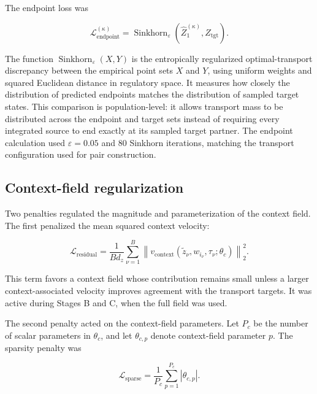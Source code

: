 The endpoint loss was

\begin{equation}
\mathcal{L}_{\mathrm{endpoint}}^{(\kappa)}
=
\operatorname{Sinkhorn}_{\varepsilon}
\left(
\widehat{Z}_1^{(\kappa)},
Z_{\mathrm{tgt}}
\right).
\label{appb-eq:methods-endpoint-loss}
\end{equation}

The function
\(\operatorname{Sinkhorn}_{\varepsilon}(X,Y)\) is the entropically
regularized optimal-transport discrepancy between the empirical point sets
\(X\) and \(Y\), using uniform weights and squared Euclidean distance in
regulatory space. It measures how closely the distribution of predicted
endpoints matches the distribution of sampled target states. This comparison
is population-level: it allows transport mass to be distributed across the
endpoint and target sets instead of requiring every integrated source to end
exactly at its sampled target partner. The endpoint calculation used
\(\varepsilon=0.05\) and \(80\) Sinkhorn iterations, matching the transport
configuration used for pair construction.

\subsection{Context-field regularization}
\label{appb-sec:methods-context-regularization}

Two penalties regulated the magnitude and parameterization of the context
field. The first penalized the mean squared context velocity:

\begin{equation}
\mathcal{L}_{\mathrm{residual}}
=
\frac{1}{B d_z}
\sum_{\nu=1}^{B}
\left\|
v_{\mathrm{context}}
\left(
\widetilde{z}_\nu,
w_{i_\nu},
\tau_\nu;
\theta_c
\right)
\right\|_2^2.
\label{appb-eq:methods-context-residual-penalty}
\end{equation}

This term favors a context field whose contribution remains small unless a
larger context-associated velocity improves agreement with the transport
targets. It was active during Stages B and C, when the full field was used.

The second penalty acted on the context-field parameters. Let \(P_c\) be the
number of scalar parameters in \(\theta_c\), and let \(\theta_{c,p}\) denote
context-field parameter \(p\). The sparsity penalty was

\begin{equation}
\mathcal{L}_{\mathrm{sparse}}
=
\frac{1}{P_c}
\sum_{p=1}^{P_c}
\left|
\theta_{c,p}
\right|.
\label{appb-eq:methods-context-sparsity}
\end{equation}

